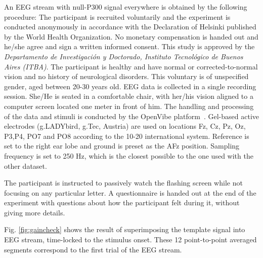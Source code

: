 \documentclass[brainsci,article,submit,moreauthors,pdftex,10pt,a4paper]{mdpi}
\begin{document}
An EEG stream with null-P300 signal everywhere is obtained by the following procedure: 
The participant is recruited voluntarily and the experiment is conducted anonymously in accordance with the Declaration of Helsinki published by the World Health Organization.  No monetary compensation is handed out and he/she agree and sign a written informed consent.  This study is approved by the \textit{Departamento de Investigación y Doctorado, Instituto Tecnológico de Buenos Aires (ITBA)}.  The participant is healthy and have normal or corrected-to-normal vision and no history of neurological disorders. This voluntary is of unspecified gender, aged between 20-30 years old.  EEG data is collected in a single recording session. She/He is seated in a comfortable chair, with her/his vision aligned to a computer screen located one meter in front of him.  The handling and processing of the data and stimuli is conducted by the OpenVibe platform~\citep{Renard2010}.  Gel-based active electrodes (g.LADYbird, g.Tec, Austria) are used on locations Fz, Cz, Pz, Oz, P3,P4, PO7 and PO8 according to the 10-20 international system.  Reference is set to the right ear lobe and ground is preset as the AFz position.   Sampling frequency is set to 250 Hz, which is the closest possible to the one used with the other dataset. 

The participant is instructed to passively watch the flashing screen while not focusing on any particular letter.  A questionnaire is handed out at the end of the experiment with questions about how the participant felt during it, without giving more details.  


Fig. \ref{fig:gaincheck} shows the result of superimposing the template signal into EEG stream, time-locked to the stimulus onset.   These 12 point-to-point averaged segments correspond to the first trial of the EEG stream.

\end{document}
